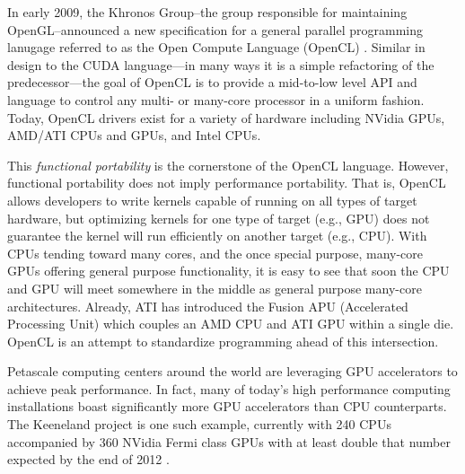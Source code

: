 \documentclass{report}
\begin{document}
In early 2009, the Khronos Group--the group responsible for maintaining OpenGL--announced a new specification for a general 
parallel programming lanugage referred to as the Open Compute Language (OpenCL) \cite{OpenCL2009}. Similar in design to the CUDA language---in many ways it is a simple refactoring of the predecessor---the goal of OpenCL is to provide a mid-to-low level API and language to control any multi- or many-core processor in a uniform fashion. Today, OpenCL drivers exist for a variety of hardware including NVidia GPUs, AMD/ATI CPUs and GPUs, and Intel CPUs. 

This \textit{functional portability} is the cornerstone of the OpenCL language. However, functional portability does not imply performance portability. That is, OpenCL allows developers to write kernels capable of running on all types of target hardware, but optimizing kernels for one type of target (e.g., GPU) does not guarantee the kernel will run efficiently on another target (e.g., CPU).
With CPUs tending toward many cores, and the once special purpose, many-core GPUs offering general purpose functionality, it is easy to see that soon the CPU and GPU will meet somewhere in the middle as general purpose many-core architectures. Already, ATI has introduced the Fusion APU (Accelerated Processing Unit) which couples an AMD CPU and ATI GPU within a single die. OpenCL is an attempt to standardize programming ahead of this intersection. 


Petascale computing centers around the world are leveraging GPU accelerators to achieve peak performance. In fact, many of today's high performance computing installations boast significantly more GPU accelerators than CPU counterparts. The Keeneland project is one such example, currently with 240 CPUs accompanied by 360 NVidia Fermi class GPUs with at least double that number expected by the end of 2012 \cite{Vetter2011}. 
\end{document}
